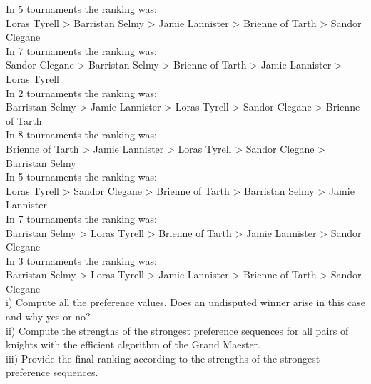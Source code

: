 \documentclass{article}
\begin{document}
\noindent In 5 tournaments the ranking was:\\ Loras Tyrell > Barristan Selmy >
Jamie Lannister > Brienne of Tarth > Sandor Clegane\\

\noindent In 7 tournaments the ranking was:\\ Sandor Clegane > Barristan Selmy >
Brienne of Tarth > Jamie Lannister > Loras Tyrell\\

\noindent In 2 tournaments the ranking was:\\ Barristan Selmy > Jamie Lannister >
Loras Tyrell > Sandor Clegane > Brienne of Tarth\\

\noindent In 8 tournaments the ranking was:\\ Brienne of Tarth > Jamie Lannister >
Loras Tyrell > Sandor Clegane > Barristan Selmy\\

\noindent In 5 tournaments the ranking was:\\ Loras Tyrell > Sandor Clegane >
Brienne of Tarth > Barristan Selmy > Jamie Lannister\\

\noindent In 7 tournaments the ranking was:\\ Barristan Selmy > Loras Tyrell >
Brienne of Tarth > Jamie Lannister > Sandor Clegane\\

\noindent In 3 tournaments the ranking was:\\ Barristan Selmy > Loras Tyrell >
Jamie Lannister > Brienne of Tarth > Sandor Clegane\\

\noindent i) Compute all the preference values. Does an undisputed winner
arise in this case and why yes or no?\\

\noindent ii) Compute the strengths of the strongest preference
sequences for all pairs of knights with the efficient algorithm of the
Grand Maester.\\

\noindent iii) Provide the final ranking according to the strengths of
the strongest preference sequences.\\
\end{document}
